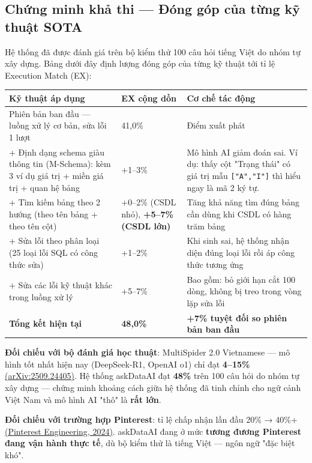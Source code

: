 \documentclass[11pt,a4paper]{article}
\begin{document}
\subsection{Chứng minh khả thi --- Đóng góp của từng kỹ thuật SOTA}

Hệ thống đã được đánh giá trên bộ kiểm thử 100 câu hỏi tiếng Việt do nhóm tự xây dựng. Bảng dưới đây định lượng đóng góp của từng kỹ thuật tới tỉ lệ Execution Match (EX):

\begin{longtable}{|L{4.5cm}|R{2.4cm}|L{7cm}|}
\hline
{}\textbf{Kỹ thuật áp dụng} & \textbf{EX cộng dồn} & \textbf{Cơ chế tác động} \\
\hline\endhead

Phiên bản ban đầu --- luồng xử lý cơ bản, sửa lỗi 1 lượt & 41,0\% & Điểm xuất phát \\ \hline
+ Định dạng schema giàu thông tin (M-Schema): kèm 3 ví dụ giá trị + miền giá trị + quan hệ bảng & +1--3\% & Mô hình AI giảm đoán sai. Ví dụ: thấy cột "Trạng thái" có giá trị mẫu \texttt{["A","I"]} thì hiểu ngay là mã 2 ký tự. \\ \hline
+ Tìm kiếm bảng theo 2 hướng (theo tên bảng + theo tên cột) & +0--2\% (CSDL nhỏ), \textbf{+5--7\% (CSDL lớn)} & Tăng khả năng tìm đúng bảng cần dùng khi CSDL có hàng trăm bảng \\ \hline
+ Sửa lỗi theo phân loại (25 loại lỗi SQL có công thức sửa) & +1--2\% & Khi sinh sai, hệ thống nhận diện đúng loại lỗi rồi áp công thức tương ứng \\ \hline
+ Sửa các lỗi kỹ thuật khác trong luồng xử lý & +5--7\% & Bao gồm: bỏ giới hạn cắt 100 dòng, không bị treo trong vòng lặp sửa lỗi \\ \hline
\textbf{Tổng kết hiện tại} & \textbf{48,0\%} & \textbf{+7\% tuyệt đối so phiên bản ban đầu} \\ \hline

\end{longtable}

\textbf{Đối chiếu với bộ đánh giá học thuật}: MultiSpider 2.0 Vietnamese --- mô hình tốt nhất hiện nay (DeepSeek-R1, OpenAI o1) chỉ đạt \textbf{4--15\%} \href{https://arxiv.org/html/2509.24405}{(arXiv:2509.24405)}. Hệ thống askDataAI đạt \textbf{48\%} trên 100 câu hỏi do nhóm tự xây dựng --- chứng minh khoảng cách giữa hệ thống đã tinh chỉnh cho ngữ cảnh Việt Nam và mô hình AI "thô" là \textbf{rất lớn}.

\textbf{Đối chiếu với trường hợp Pinterest}: tỉ lệ chấp nhận lần đầu 20\% → 40\%+ \href{https://medium.com/pinterest-engineering/how-we-built-text-to-sql-at-pinterest-30bad30dabff}{(Pinterest Engineering, 2024)}. askDataAI đang ở mức \textbf{tương đương Pinterest đang vận hành thực tế}, dù bộ kiểm thử là tiếng Việt --- ngôn ngữ "đặc biệt khó".
\end{document}
